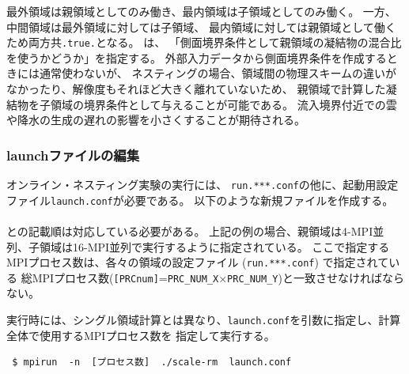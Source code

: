 \noindent 最外領域は親領域としてのみ働き、最内領域は子領域としてのみ働く。
一方、中間領域は最外領域に対しては子領域、
最内領域に対しては親領域として働くため両方共\verb|.true.|となる。
は、
「側面境界条件として親領域の凝結物の混合比を使うかどうか」を指定する。
外部入力データから側面境界条件を作成するときには通常使わないが、
ネスティングの場合、領域間の物理スキームの違いがなかったり、解像度もそれほど大きく離れていないため、
親領域で計算した凝結物を子領域の境界条件として与えることが可能である。
流入境界付近での雲や降水の生成の遅れの影響を小さくすることが期待される。



\subsubsection{launchファイルの編集}
\label{subsubsec:launch}
オンライン・ネスティング実験の実行には、
\verb|run.***.conf|の他に、起動用設定ファイル\verb|launch.conf|が必要である。
以下のような新規ファイルを作成する。\\

\\

\noindent 
{}との記載順は対応している必要がある。
上記の例の場合、親領域は4-MPI並列、子領域は16-MPI並列で実行するように指定されている。
ここで指定するMPIプロセス数は、各々の領域の設定ファイル (\verb|run.***.conf|) で指定されている
総MPIプロセス数(\verb|[PRCnum]|=\verb|PRC_NUM_X|$\times$\verb|PRC_NUM_Y|)と一致させなければならない。

実行時には、シングル領域計算とは異なり、\verb|launch.conf|を引数に指定し、計算全体で使用するMPIプロセス数を
指定して実行する。
\begin{verbatim}
 $ mpirun  -n  [プロセス数]  ./scale-rm  launch.conf
\end{verbatim}

